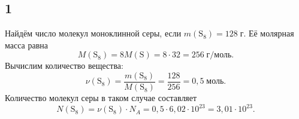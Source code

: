 \subsection{1}
Найдём число молекул моноклинной серы, если $m(\mathrm{S_8})=128\;\text{г}$. Её молярная масса равна
\[
M(\mathrm{S_8})=8M(\mathrm{S})=8\cdot32=256\;\text{г/моль}.
\]
Вычислим количество вещества:
\[
\nu(\mathrm{S_8})=\frac{m(\mathrm{S_8})}{M(\mathrm{S_8})}=\frac{128}{256}=0{,}5\;\text{моль}.
\]
Количество молекул серы в таком случае составляет
\[
N(\mathrm{S_8})=\nu(\mathrm{S_8})\cdot N_A=0{,}5\cdot6{,}02\cdot10^{23}=3{,}01\cdot10^{23}.
\]